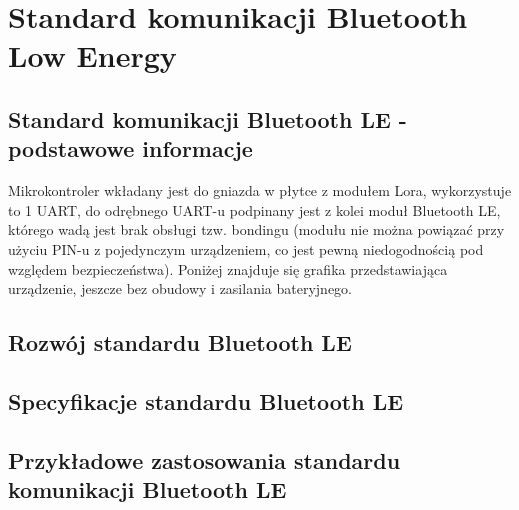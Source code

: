 \chapter{Standard komunikacji Bluetooth Low Energy}
\section{Standard komunikacji Bluetooth LE - podstawowe informacje}
Mikrokontroler wkładany jest do gniazda w płytce z modułem Lora, wykorzystuje to 1 UART, do odrębnego UART-u podpinany jest z kolei moduł Bluetooth LE, którego wadą jest brak obsługi tzw. bondingu (modułu nie można powiązać przy użyciu PIN-u z pojedynczym urządzeniem, co jest pewną niedogodnością pod względem bezpieczeństwa).
Poniżej znajduje się grafika przedstawiająca urządzenie, jeszcze bez obudowy i zasilania bateryjnego.
\section{Rozwój standardu Bluetooth LE}
\section{Specyfikacje standardu Bluetooth LE}
\section{Przykładowe zastosowania standardu komunikacji Bluetooth LE}